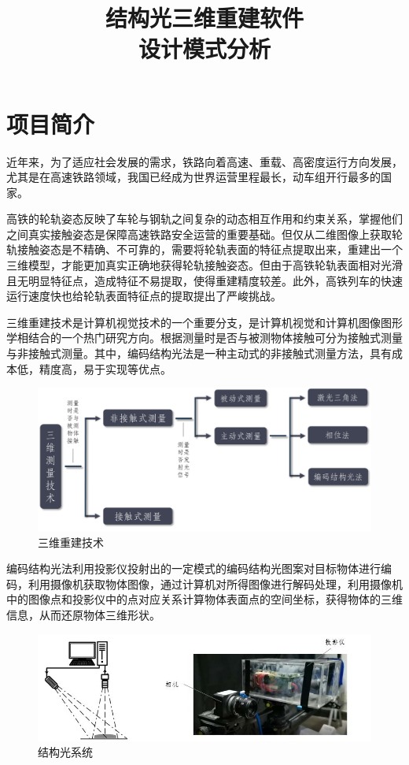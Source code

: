 \documentclass[article]{BJTU-thesis}
\title{结构光三维重建软件\\设计模式分析}
\begin{document}
	\makecover
	
	\tableofcontents
	\newpage

	\newpage
	\setcounter{page}{1}
	\section{项目简介}
     近年来，为了适应社会发展的需求，铁路向着高速、重载、高密度运行方向发展，尤其是在高速铁路领域，我国已经成为世界运营里程最长，动车组开行最多的国家。
     
     高铁的轮轨姿态反映了车轮与钢轨之间复杂的动态相互作用和约束关系，掌握他们之间真实接触姿态是保障高速铁路安全运营的重要基础。但仅从二维图像上获取轮轨接触姿态是不精确、不可靠的，需要将轮轨表面的特征点提取出来，重建出一个三维模型，才能更加真实正确地获得轮轨接触姿态。但由于高铁轮轨表面相对光滑且无明显特征点，造成特征不易提取，使得重建精度较差。此外，高铁列车的快速运行速度快也给轮轨表面特征点的提取提出了严峻挑战。
  
 	 三维重建技术是计算机视觉技术的一个重要分支，是计算机视觉和计算机图像图形学相结合的一个热门研究方向。根据测量时是否与被测物体接触可分为接触式测量与非接触式测量。其中，编码结构光法是一种主动式的非接触式测量方法，具有成本低，精度高，易于实现等优点。
 	 
     \begin{figure}[!htbp]
     	\centering
     	\includegraphics[scale=0.7]{0.png}
     	\caption{三维重建技术}
     \end{figure}
     
     编码结构光法利用投影仪投射出的一定模式的编码结构光图案对目标物体进行编码，利用摄像机获取物体图像，通过计算机对所得图像进行解码处理，利用摄像机中的图像点和投影仪中的点对应关系计算物体表面点的空间坐标，获得物体的三维信息，从而还原物体三维形状。
 
	 \begin{figure}[!htbp]
	 	\centering
	 	\includegraphics{1.png}
	 	\caption{结构光系统}
	 \end{figure}
 
\end{document}
